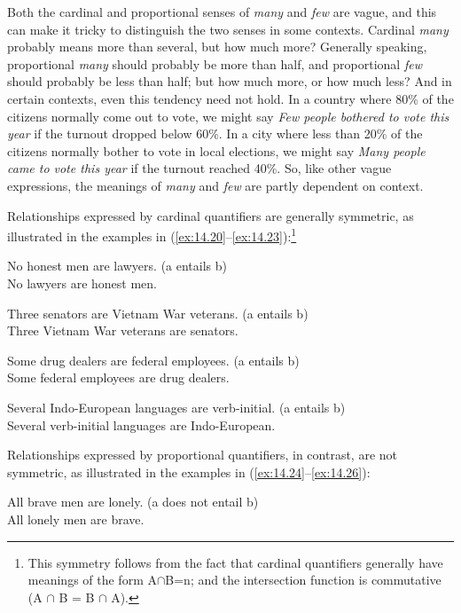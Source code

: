 Both the cardinal and proportional senses of \textit{many} and \textit{few} are vague, and this can make it tricky to distinguish the two senses in some contexts. Cardinal \textit{many} probably means more than several, but how much more? Generally speaking, proportional \textit{many} should probably be more than half, and proportional \textit{few} should probably be less than half; but how much more, or how much less? And in certain contexts, even this tendency need not hold. In a country where 80\% of the citizens normally come out to vote, we might say \textit{Few people bothered to vote this year} if the turnout dropped below 60\%. In a city where less than 20\% of the citizens normally bother to vote in local elections, we might say \textit{Many people came to vote this year} if the turnout reached 40\%. So, like other vague expressions, the meanings of \textit{many} and \textit{few} are partly dependent on context.



Relationships expressed by cardinal quantifiers are generally symmetric, as illustrated in the examples in (\ref{ex:14.20}--\ref{ex:14.23}):\footnote{This symmetry follows from the fact that cardinal quantifiers generally have meanings of the form {\textbar}A${\cap}$B{\textbar}=n; and the intersection function is commutative (A ${\cap}$ B = B ${\cap}$ A).}


\ea \label{ex:14.20}
\ea No honest men are lawyers. \hfill  (a entails b)\\
\ex No lawyers are honest men.
                       \z
\z

\ea \label{ex:14.21}
\ea Three senators are Vietnam War veterans. \hfill  (a entails b)\\
\ex Three Vietnam War veterans are senators.
\z \z

\ea \label{ex:14.22}
\ea Some drug dealers are federal employees. \hfill  (a entails b)\\
\ex Some federal employees are drug dealers.
\z \z

\ea \label{ex:14.23}
\ea Several Indo-European languages are verb-initial. \hfill  (a entails b)\\
\ex Several verb-initial languages are Indo-European.
                       \z
\z


Relationships expressed by proportional quantifiers, in contrast, are not symmetric, as illustrated in the examples in (\ref{ex:14.24}--\ref{ex:14.26}):


\ea \label{ex:14.24}
\ea All brave men are lonely. \hfill  (a does not entail b)\\
\ex All lonely men are brave.
                       \z
\z

